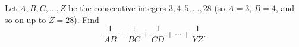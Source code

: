 Let $A,B,C,\dots,Z$ be the consecutive integers $3,4,5,\dots,28$ (so $A=3$, $B=4$, and so on up to $Z=28$). Find
\[
\dfrac{1}{AB}+\dfrac{1}{BC}+\dfrac{1}{CD}+\cdots+\dfrac{1}{YZ}.
\]
